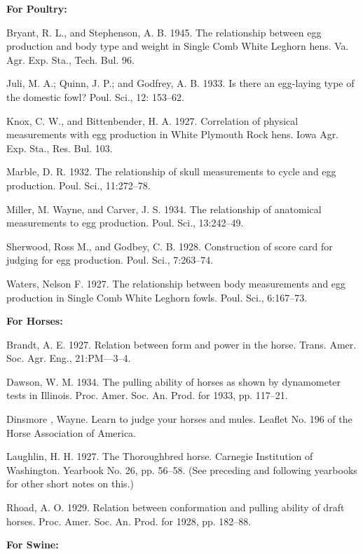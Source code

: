 \noindent
\textbf{For Poultry:}

\begin{hangparas}{0.5in}{1}%
Bryant, R. L., and Stephenson, A. B. 1945. The relationship between egg production
and body type and weight in Single Comb White Leghorn hens. Va. Agr. Exp. Sta.,
Tech. Bul. 96.

Juli, M. A.; Quinn, J. P.; and Godfrey, A. B. 1933. Is there an egg-laying type of the
domestic fowl? Poul. Sci., 12: 153--62.

Knox, C. W., and Bittenbender, H. A. 1927. Correlation of physical measurements
with egg production in White Plymouth Rock hens. Iowa Agr. Exp. Sta.,
Res. Bul. 103.

Marble, D. R. 1932. The relationship of skull measurements to cycle and egg
production. Poul. Sci., 11:272--78.

Miller, M. Wayne, and Carver, J. S. 1934. The relationship of anatomical measurements
to egg production. Poul. Sci., 13:242--49.

Sherwood, Ross M., and Godbey, C. B. 1928. Construction of score card for judging
for egg production. Poul. Sci., 7:263--74.

Waters, Nelson F. 1927. The relationship between body measurements and egg production
in Single Comb White Leghorn fowls. Poul. Sci., 6:167--73.
\end{hangparas}

\noindent
\textbf{For Horses:}

\begin{hangparas}{0.5in}{1}%
Brandt, A. E. 1927. Relation between form and power in the horse. Trans. Amer.
Soc. Agr. Eng., 21:PM---3--4.

Dawson, W. M. 1934. The pulling ability of horses as shown by dynamometer tests
in Illinois. Proc. Amer. Soc. An. Prod. for 1933, pp. 117--21.

Dinsmore , Wayne. Learn to judge your horses and mules. Leaflet No. 196 of the
Horse Association of America.

Laughlin, H. H. 1927. The Thoroughbred horse. Carnegie Institution of Washington.
Yearbook No. 26, pp. 56--58. (See preceding and following yearbooks
for other short notes on this.)

Rhoad, A. O. 1929. Relation between conformation and pulling ability of draft
horses. Proc. Amer. Soc. An. Prod. for 1928, pp. 182--88.
\end{hangparas}

\noindent
\textbf{For Swine:}

